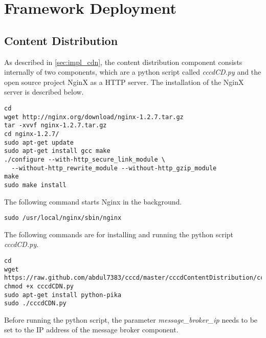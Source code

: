 \chapter*{Framework Deployment\label{cha:chapter7}}

\section{Content Distribution\label{sec:eval_te_cd}}
As described in \ref{sec:impl_cdn}, the content distribution component consists internally of two components, which are a python script called \textit{cccdCD.py} and the open source project NginX as a \ac{HTTP} server. The installation of the NginX server is described below.

\begin{code}
\begin{verbatim}
cd
wget http://nginx.org/download/nginx-1.2.7.tar.gz
tar -xvvf nginx-1.2.7.tar.gz 
cd nginx-1.2.7/
sudo apt-get update
sudo apt-get install gcc make
./configure --with-http_secure_link_module \
  --without-http_rewrite_module --without-http_gzip_module
make
sudo make install
\end{verbatim}
\end{code}

The following command starts Nginx in the background.

\begin{code}
\begin{verbatim}
sudo /usr/local/nginx/sbin/nginx
\end{verbatim}
\end{code}

The following commands are for installing and running the python script \textit{cccdCD.py}.

\begin{code}
\begin{verbatim}
cd
wget https://raw.github.com/abdul7383/cccd/master/cccdContentDistribution/cccdCDN.py
chmod +x cccdCDN.py
sudo apt-get install python-pika
sudo ./cccdCDN.py
\end{verbatim}
\end{code}

Before running the python script, the parameter \textit{message\_broker\_ip} needs to be set to the IP address of the message broker component.